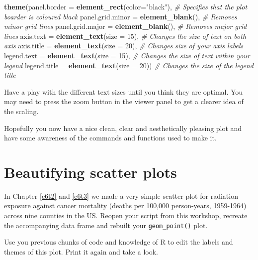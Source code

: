 \documentclass[
]{book}
\newenvironment{Shaded}{\begin{snugshade}}{\end{snugshade}}
\newcommand{\AttributeTok}[1]{\textcolor[rgb]{0.13,0.29,0.53}{#1}}
\newcommand{\CommentTok}[1]{\textcolor[rgb]{0.56,0.35,0.01}{\textit{#1}}}
\newcommand{\DecValTok}[1]{\textcolor[rgb]{0.00,0.00,0.81}{#1}}
\newcommand{\FunctionTok}[1]{\textcolor[rgb]{0.13,0.29,0.53}{\textbf{#1}}}
\newcommand{\NormalTok}[1]{#1}
\newcommand{\StringTok}[1]{\textcolor[rgb]{0.31,0.60,0.02}{#1}}
\begin{document}
\begin{Shaded}
\begin{Highlighting}[]
\FunctionTok{theme}\NormalTok{(}\AttributeTok{panel.border =} \FunctionTok{element\_rect}\NormalTok{(}\AttributeTok{color=}\StringTok{"black"}\NormalTok{), }\CommentTok{\# Specifies that the plot boarder is coloured black}
        \AttributeTok{panel.grid.minor =} \FunctionTok{element\_blank}\NormalTok{(), }\CommentTok{\# Removes minor grid lines }
        \AttributeTok{panel.grid.major =} \FunctionTok{element\_blank}\NormalTok{(), }\CommentTok{\# Removes major grid lines }
        \AttributeTok{axis.text =} \FunctionTok{element\_text}\NormalTok{(}\AttributeTok{size =} \DecValTok{15}\NormalTok{), }\CommentTok{\# Changes the size of text on both axis }
        \AttributeTok{axis.title =} \FunctionTok{element\_text}\NormalTok{(}\AttributeTok{size =} \DecValTok{20}\NormalTok{), }\CommentTok{\# Changes size of your axis labels }
        \AttributeTok{legend.text =} \FunctionTok{element\_text}\NormalTok{(}\AttributeTok{size =} \DecValTok{15}\NormalTok{), }\CommentTok{\# Changes the size of text within your legend}
        \AttributeTok{legend.title =} \FunctionTok{element\_text}\NormalTok{(}\AttributeTok{size =} \DecValTok{20}\NormalTok{)) }\CommentTok{\# Changes the size of the legend title}
\end{Highlighting}
\end{Shaded}

Have a play with the different text sizes until you think they are optimal. You may need to press the zoom button in the viewer panel to get a clearer idea of the scaling.

Hopefully you now have a nice clean, clear and aesthetically pleasing plot and have some awareness of the commands and functions used to make it.

\hypertarget{beautifying-scatter-plots}{%
\section{Beautifying scatter plots}\label{beautifying-scatter-plots}}

In Chapter \ref{c6t2} and \ref{c6t3} we made a very simple scatter plot for radiation exposure against cancer mortality (deaths per 100,000 person-years, 1959-1964) across nine counties in the US. Reopen your script from this workshop, recreate the accompanying data frame and rebuilt your \texttt{geom\_point()} plot.

Use you previous chunks of code and knowledge of R to edit the labels and themes of this plot. Print it again and take a look.
\end{document}
